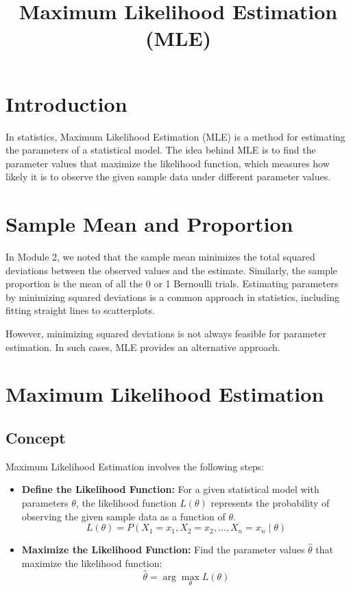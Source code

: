 \documentclass{article}
\begin{document}
\title{Maximum Likelihood Estimation (MLE)}
\author{}
\date{}
\maketitle

\section{Introduction}
In statistics, Maximum Likelihood Estimation (MLE) is a method for estimating the parameters of a statistical model. The idea behind MLE is to find the parameter values that maximize the likelihood function, which measures how likely it is to observe the given sample data under different parameter values.

\section{Sample Mean and Proportion}
In Module 2, we noted that the sample mean minimizes the total squared deviations between the observed values and the estimate. Similarly, the sample proportion is the mean of all the 0 or 1 Bernoulli trials. Estimating parameters by minimizing squared deviations is a common approach in statistics, including fitting straight lines to scatterplots.

However, minimizing squared deviations is not always feasible for parameter estimation. In such cases, MLE provides an alternative approach.

\section{Maximum Likelihood Estimation}
\subsection{Concept}
Maximum Likelihood Estimation involves the following steps:
\begin{itemize}
    \item \textbf{Define the Likelihood Function:} For a given statistical model with parameters \(\theta\), the likelihood function \(L(\theta)\) represents the probability of observing the given sample data as a function of \(\theta\).
    \[
    L(\theta) = P(X_1 = x_1, X_2 = x_2, \ldots, X_n = x_n \mid \theta)
    \]
    \item \textbf{Maximize the Likelihood Function:} Find the parameter values \(\hat{\theta}\) that maximize the likelihood function:
    \[
    \hat{\theta} = \arg \max_{\theta} L(\theta)
    \]
\end{itemize}
\end{document}
